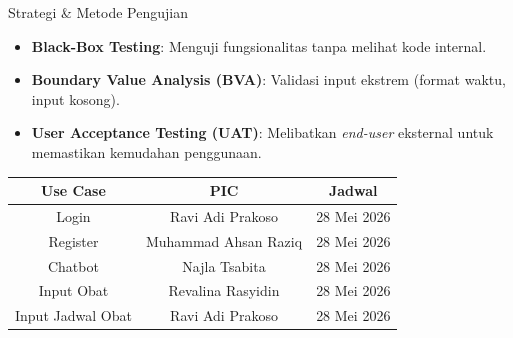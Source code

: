 \documentclass[10pt, aspectratio=169]{beamer}
\begin{document}
\begin{frame}{Strategi \& Metode Pengujian}
    \begin{itemize}
        \item \textbf{Black-Box Testing}: Menguji fungsionalitas tanpa melihat kode internal.
        \item \textbf{Boundary Value Analysis (BVA)}: Validasi input ekstrem (format waktu, input kosong).
        \item \textbf{User Acceptance Testing (UAT)}: Melibatkan \textit{end-user} eksternal untuk memastikan kemudahan penggunaan.
    \end{itemize}
    \vspace{0.5cm}
    \begin{table}[]
    \small
    \begin{tabular}{|c|c|c|}
        \hline
        \textbf{Use Case} & \textbf{PIC} & \textbf{Jadwal} \\
        \hline
        Login & Ravi Adi Prakoso & 28 Mei 2026 \\
        Register & Muhammad Ahsan Raziq & 28 Mei 2026 \\
        Chatbot & Najla Tsabita & 28 Mei 2026 \\
        Input Obat & Revalina Rasyidin & 28 Mei 2026 \\
        Input Jadwal Obat & Ravi Adi Prakoso & 28 Mei 2026 \\
        \hline
    \end{tabular}
    \end{table}
\end{frame}
\end{document}
